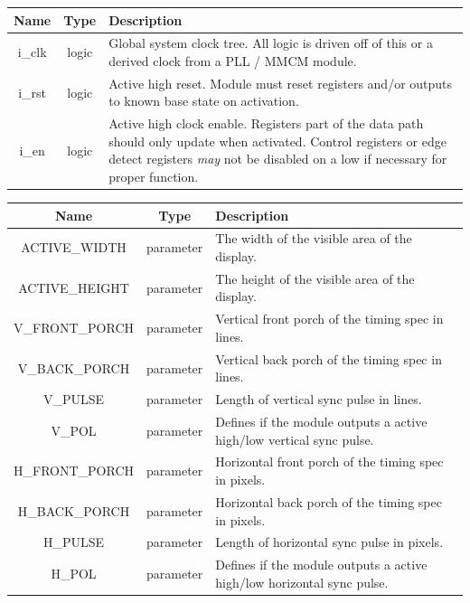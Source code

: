 \documentclass[12pt]{article}
\begin{document}
\begingroup
{}
\label{tab:input_common}
\begin{tabularx}{\linewidth}{ ||c|c|X|| }
    \hline
    Name & Type & Description \\
    \hline
    i\_clk & logic & Global system clock tree. All logic is driven off of this
    or a derived clock from a PLL / MMCM module. \\
    i\_rst & logic & Active high reset. Module must reset registers and/or
    outputs to known base state on activation. \\
    i\_en   & logic & Active high clock enable. Registers part of the data path
    should only update when activated. Control registers or edge detect
    registers \emph{may} not be disabled on a low if necessary for proper function. \\
    \hline
\end{tabularx}
\endgroup

\vspace{0.5in}
\begingroup
{}
\label{tab:input_vtg}
\begin{tabularx}{\linewidth}{ ||c|c|X|| }
    \hline
    Name & Type & Description \\
    \hline
    ACTIVE\_WIDTH & parameter & The width of the visible area of the display. \\
    ACTIVE\_HEIGHT & parameter & The height of the visible area of the display.
    \\
    V\_FRONT\_PORCH & parameter & Vertical front porch of the timing spec in
    lines. \\
    V\_BACK\_PORCH & parameter & Vertical back porch of the timing spec in
    lines. \\
    V\_PULSE & parameter & Length of vertical sync pulse in lines. \\
    V\_POL & parameter & Defines if the module outputs a active high/low
    vertical sync pulse. \\
    H\_FRONT\_PORCH & parameter & Horizontal front porch of the timing spec in
    pixels. \\
    H\_BACK\_PORCH & parameter & Horizontal back porch of the timing spec in
    pixels. \\
    H\_PULSE & parameter & Length of horizontal sync pulse in pixels. \\
    H\_POL & parameter & Defines if the module outputs a active high/low
    horizontal sync pulse. \\
    \hline
\end{tabularx}
\endgroup
\end{document}
